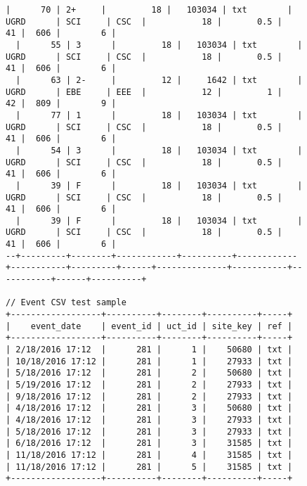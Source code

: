 \begin{figure}[H]
\begin{mdframed}[rightline=true,leftline=true]
\begin{BVerbatim}[fontsize=\tiny]
  |      70 | 2+     |         18 |   103034 | txt        | UGRD      | SCI     | CSC  |           18 |       0.5 |        41 |  606 |        6 |
  |      55 | 3      |         18 |   103034 | txt        | UGRD      | SCI     | CSC  |           18 |       0.5 |        41 |  606 |        6 |
  |      63 | 2-     |         12 |     1642 | txt        | UGRD      | EBE     | EEE  |           12 |         1 |        42 |  809 |        9 |
  |      77 | 1      |         18 |   103034 | txt        | UGRD      | SCI     | CSC  |           18 |       0.5 |        41 |  606 |        6 |
  |      54 | 3      |         18 |   103034 | txt        | UGRD      | SCI     | CSC  |           18 |       0.5 |        41 |  606 |        6 |
  |      39 | F      |         18 |   103034 | txt        | UGRD      | SCI     | CSC  |           18 |       0.5 |        41 |  606 |        6 |
  |      39 | F      |         18 |   103034 | txt        | UGRD      | SCI     | CSC  |           18 |       0.5 |        41 |  606 |        6 |
--+---------+--------+------------+----------+------------+-----------+---------+------+--------------+-----------+-----------+------+----------+

// Event CSV test sample
+------------------+----------+--------+----------+-----+
|    event_date    | event_id | uct_id | site_key | ref |
+------------------+----------+--------+----------+-----+
| 2/18/2016 17:12  |      281 |      1 |    50680 | txt |
| 10/18/2016 17:12 |      281 |      1 |    27933 | txt |
| 5/18/2016 17:12  |      281 |      2 |    50680 | txt |
| 5/19/2016 17:12  |      281 |      2 |    27933 | txt |
| 9/18/2016 17:12  |      281 |      2 |    27933 | txt |
| 4/18/2016 17:12  |      281 |      3 |    50680 | txt |
| 4/18/2016 17:12  |      281 |      3 |    27933 | txt |
| 5/18/2016 17:12  |      281 |      3 |    27933 | txt |
| 6/18/2016 17:12  |      281 |      3 |    31585 | txt |
| 11/18/2016 17:12 |      281 |      4 |    31585 | txt |
| 11/18/2016 17:12 |      281 |      5 |    31585 | txt |
+------------------+----------+--------+----------+-----+


\end{BVerbatim}
\end{mdframed}
\end{figure}
